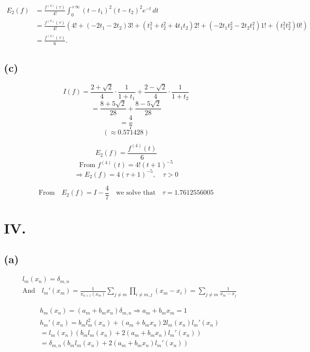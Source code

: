 \documentclass[a4paper]{article}
\begin{document}
\begin{align*}
E_2(f) &= \frac{f^{(4)}(\tau)}{4!} \int_0^{+\infty} (t - t_1)^2 (t - t_2)^2 e^{-t} \, dt \\
&= \frac{f^{(4)}(\tau)}{4!} \left( 4! + (-2t_1 - 2t_2) 3! + (t_1^2 + t_2^2 + 4t_1 t_2) 2! + (-2t_1 t_2^2 - 2t_2 t_1^2) 1! + (t_1^2 t_2^2) 0! \right) \\
&= \frac{f^{(4)}(\tau)}{6}.
\end{align*}

\subsection*{(c)}
\[
I(f) = \frac{2+\sqrt{2}}{4} \cdot \frac{1}{1+t_1} + \frac{2-\sqrt{2}}{4} \cdot \frac{1}{1+t_2}
\]
\[
= \frac{8+5\sqrt{2}}{28} + \frac{8-5\sqrt{2}}{28}
\]
\[
= \frac{4}{7}
\]
\[
(\approx 0.571428)
\]

\[
E_2(f) = \frac{f^{(4)}(t)}{6}
\]
\[
\text{From } f^{(4)}(t) = 4!(t+1)^{-5}
\]
\[
\Rightarrow E_2(f) = 4(\tau+1)^{-5}, \quad \tau > 0
\]

\[
\text{From} \quad E_2(f) = I - \frac{4}{7} \quad \text{we solve that} \quad \tau = 1.7612556005
\]

\section*{IV.}

\subsection*{(a)}

\begin{align*}
  &\ l_m(x_n) = \delta_{m,n} \\
  &\ \text{And} \quad l_m'(x_m) = \frac{1}{\pi_{n+1}(x_m)} \sum_{j \neq m} \prod_{i \neq m, j} (x_m - x_i) = \sum_{j \neq m} \frac{1}{x_m - x_j}
\end{align*}

\begin{align*}
  &\ h_m(x_n) = (a_m + b_m x_n) \delta_{m,n} \Rightarrow a_m + b_m x_m = 1 \\
  &\ h_m'(x_n) = b_m l_m^2(x_n) + (a_m + b_m x_n) 2 l_m(x_n) l_m'(x_n) \\
  &\ = l_m(x_n) (b_m l_m(x_n) + 2 (a_m + b_m x_n) l_m'(x_n)) \\
  &\ = \delta_{m,n} (b_m l_m(x_n) + 2 (a_m + b_m x_n) l_m'(x_n))
\end{align*}
\end{document}

